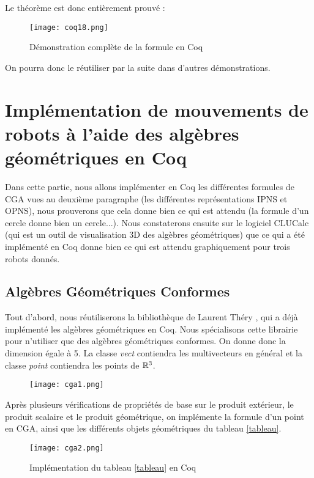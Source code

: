 Le théorème est donc entièrement prouvé :

\begin{figure}[!ht]
\centering
\texttt{[image: coq18.png]}
\caption{Démonstration complète de la formule en Coq}
\end{figure}

On pourra donc le réutiliser par la suite dans d'autres démonstrations.


\section{Implémentation de mouvements de robots à l'aide des algèbres géométriques en Coq}

Dans cette partie, nous allons implémenter en Coq les différentes formules de CGA vues au deuxième paragraphe (les différentes représentations IPNS et OPNS), nous prouverons que cela donne bien ce qui est attendu (la formule d'un cercle donne bien un cercle...). Nous constaterons ensuite sur le logiciel CLUCalc (qui est un outil  de visualisation 3D des algèbres géométriques) que ce qui a été implémenté en Coq donne bien ce qui est attendu graphiquement pour trois robots donnés. 

\subsection{Algèbres Géométriques Conformes}

Tout d'abord, nous réutiliserons la bibliothèque de Laurent Théry \cite{Thery}, qui a déjà implémenté les algèbres géométriques en Coq. Nous spécialisons cette librairie pour n'utiliser que des algèbres géométriques conformes. On donne donc la dimension égale à 5. La classe \textit{vect} contiendra les multivecteurs en général et la classe \textit{point} contiendra les points de $\mathbb{R}^3$. 
\begin{figure}[!ht]
\centering
\texttt{[image: cga1.png]}
\end{figure}

Après plusieurs vérifications de propriétés de base sur le produit extérieur, le produit scalaire et le produit géométrique, on implémente la formule d'un point en CGA, ainsi que les différents objets géométriques du tableau \ref{tableau}.\newpage

\begin{figure}[!ht]
\centering
\texttt{[image: cga2.png]}
\caption{Implémentation du tableau \ref{tableau} en Coq}
\end{figure}

